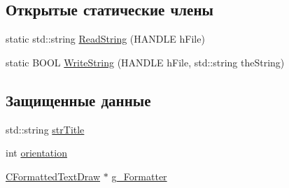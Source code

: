\subsection*{Открытые статические члены}
\begin{DoxyCompactItemize}
\item 
static std\-::string \hyperlink{class_r_t_f_string_a94673f221d744299393675f9b0e115b5}{Read\-String} (H\-A\-N\-D\-L\-E h\-File)
\item 
static B\-O\-O\-L \hyperlink{class_r_t_f_string_a15525dd2260dc2c4ba825a8b6db3db7a}{Write\-String} (H\-A\-N\-D\-L\-E h\-File, std\-::string the\-String)
\end{DoxyCompactItemize}
\subsection*{Защищенные данные}
\begin{DoxyCompactItemize}
\item 
std\-::string \hyperlink{class_r_t_f_string_ade9f23f1498c4102691b4dcf03af5435}{str\-Title}
\item 
int \hyperlink{class_r_t_f_string_a56d829be2f4b7cf88f661d52c9d794ef}{orientation}
\item 
\hyperlink{class_c_formatted_text_draw}{C\-Formatted\-Text\-Draw} $\ast$ \hyperlink{class_r_t_f_string_af121473f7d2ca2939cae4dde99ad3506}{g\-\_\-\-Formatter}
\end{DoxyCompactItemize}


